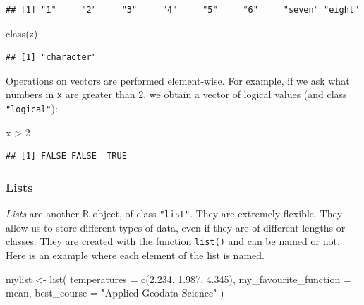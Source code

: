 \documentclass[
]{book}
\newenvironment{Shaded}{\begin{snugshade}}{\end{snugshade}}
\newcommand{\AttributeTok}[1]{\textcolor[rgb]{0.77,0.63,0.00}{#1}}
\newcommand{\DecValTok}[1]{\textcolor[rgb]{0.00,0.00,0.81}{#1}}
\newcommand{\FloatTok}[1]{\textcolor[rgb]{0.00,0.00,0.81}{#1}}
\newcommand{\FunctionTok}[1]{\textcolor[rgb]{0.00,0.00,0.00}{#1}}
\newcommand{\NormalTok}[1]{#1}
\newcommand{\OtherTok}[1]{\textcolor[rgb]{0.56,0.35,0.01}{#1}}
\newcommand{\SpecialCharTok}[1]{\textcolor[rgb]{0.00,0.00,0.00}{#1}}
\newcommand{\StringTok}[1]{\textcolor[rgb]{0.31,0.60,0.02}{#1}}
\begin{document}
\begin{verbatim}
## [1] "1"     "2"     "3"     "4"     "5"     "6"     "seven" "eight"
\end{verbatim}

\begin{Shaded}
\begin{Highlighting}[]
\FunctionTok{class}\NormalTok{(z)}
\end{Highlighting}
\end{Shaded}

\begin{verbatim}
## [1] "character"
\end{verbatim}

Operations on vectors are performed element-wise. For example, if we ask what numbers in \texttt{x} are greater than 2, we obtain a vector of logical values (and class \texttt{"logical"}):

\begin{Shaded}
\begin{Highlighting}[]
\NormalTok{x }\SpecialCharTok{\textgreater{}} \DecValTok{2}
\end{Highlighting}
\end{Shaded}

\begin{verbatim}
## [1] FALSE FALSE  TRUE
\end{verbatim}

\hypertarget{lists}{%
\subsubsection{Lists}\label{lists}}

\emph{Lists} are another R object, of class \texttt{"list"}. They are extremely flexible. They allow us to store different types of data, even if they are of different lengths or classes. They are created with the function \texttt{list()} and can be named or not. Here is an example where each element of the list is named.

\begin{Shaded}
\begin{Highlighting}[]
\NormalTok{mylist }\OtherTok{\textless{}{-}} \FunctionTok{list}\NormalTok{(}
    \AttributeTok{temperatures =} \FunctionTok{c}\NormalTok{(}\FloatTok{2.234}\NormalTok{, }\FloatTok{1.987}\NormalTok{, }\FloatTok{4.345}\NormalTok{), }
    \AttributeTok{my\_favourite\_function =}\NormalTok{ mean, }
    \AttributeTok{best\_course =} \StringTok{"Applied Geodata Science"}
\NormalTok{    )}
\end{Highlighting}
\end{Shaded}
\end{document}
